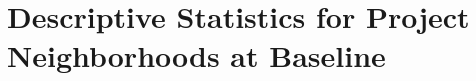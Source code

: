 \documentclass[12pt]{article}
\begin{document}








\section{Descriptive Statistics for Project Neighborhoods at Baseline}\label{section:descriptives}
\end{document}
